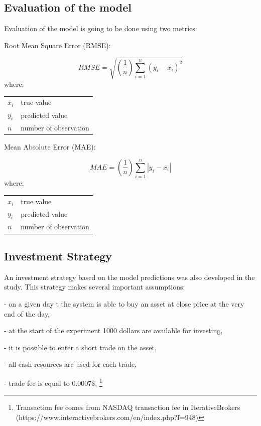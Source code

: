 \documentclass[11pt]{article} %
\makeatletter
\newenvironment{conditions}
  {\par\vspace{\abovedisplayskip}\noindent\begin{tabular}{>{$}l<{$} @{${}={}$} l}}
  {\end{tabular}\par\vspace{\belowdisplayskip}}
\makeatother
\begin{document}
\subsection{Evaluation of the model}

Evaluation of the model is going to be done using two metrics:  \\ 

\begin{center}   Root Mean Square Error (RMSE):  \end{center}
\begin{equation}  RMSE = \sqrt{(\frac{1}{n})\sum_{i=1}^{n}(y_{i} - x_{i})^{2}} \end{equation}
where:
\begin{conditions}
 x_i     &  true value \\
 y_i     &  predicted value \\   
 n &  number of observation
\end{conditions}

\begin{center}  Mean Absolute Error (MAE): \end{center}
\begin{equation} MAE =(\frac{1}{n})\sum_{i=1}^{n}\left | y_{i} - x_{i} \right | \end{equation}
where:
\begin{conditions}
 x_i     &  true value \\
 y_i     &  predicted value \\   
 n &  number of observation
\end{conditions}

\subsection{Investment Strategy}

An investment strategy based on the model predictions was also developed in the study. This strategy makes several important assumptions: 
 \begin{flushleft}- on a given day t the system is able to buy an asset at close price at the very end of the day, \end{flushleft}
 \begin{flushleft}- at the start of the experiment 1000 dollars are available for investing,  \end{flushleft}
 \begin{flushleft}- it is possible to enter a short trade on the asset, \end{flushleft}
\begin{flushleft}- all cash resources are used for each trade, \end{flushleft}
\begin{flushleft}- trade fee is equal to 0.0007\$, \footnote{Transaction fee comes from NASDAQ transaction fee in IterativeBrokers (https://www.interactivebrokers.com/en/index.php?f=948)} \end{flushleft}
\end{document}
